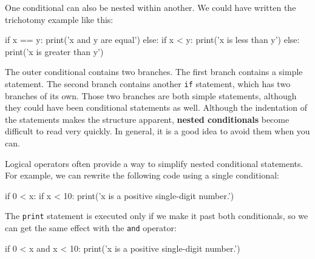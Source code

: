 One conditional can also be nested within another.  We could have
written the trichotomy example like this:

\beforeverb
\begin{pycode}
if x == y:
    print('x and y are equal')
else:
    if x < y:
        print('x is less than y')
    else:
        print('x is greater than y')
\end{pycode}
\afterverb
%
The outer conditional contains two branches.  The
first branch contains a simple statement.  The second branch
contains another {\tt if} statement, which has two branches of its
own.  Those two branches are both simple statements,
although they could have been conditional statements as well.
%
Although the indentation of the statements makes the structure
apparent, {\bf nested conditionals} become difficult to read very
quickly. In general, it is a good idea to avoid them when you can.

Logical operators often provide a way to simplify nested conditional
statements.  For example, we can rewrite the following code using a
single conditional:

\beforeverb
\begin{pycode}
if 0 < x:
    if x < 10:
        print('x is a positive single-digit number.')
\end{pycode}
\afterverb
%
The {\tt print} statement is executed only if we make it past both
conditionals, so we can get the same effect with the {\tt and} operator:

\beforeverb
\begin{pycode}
if 0 < x and x < 10:
    print('x is a positive single-digit number.')
\end{pycode}
\afterverb		


